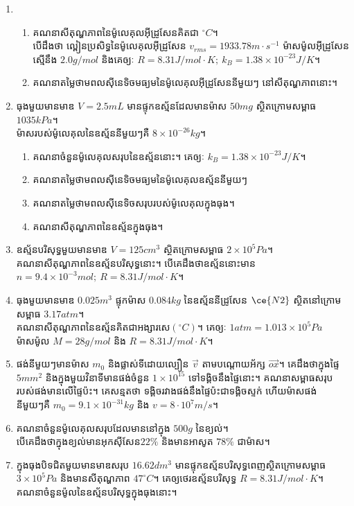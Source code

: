 \begin{enumerate}[m]
\begin{enumerate}[k]
\end{enumerate}
\item \begin{enumerate}[k]
	\item គណនាសីតុណ្ហភាពនៃម៉ូលេគុលអុីដ្រូសែនគិតជា $^\circ C$។\\ បើដឹងថា ល្ពៀនប្រសិទ្ធនៃម៉ូលេគុលអុីដ្រូសែន $v_{rms}=1933.78m\cdot s^{-1}$ ម៉ាសម៉ូលអុីដ្រូសែនស្មើនឹង $2.0g/mol$ និងគេឲ្យៈ $R=8.31J/mol\cdot K;~k_{B}=1.38\times10^{-23}J/K$។
	\item គណនាតម្លៃថាមពលសុីនេទិចមធ្យមនៃម៉ូលេគុលអុីដ្រូសែននីមួយៗ នៅសីតុណ្ហភាពនោះ។​
\end{enumerate}
\item ធុងមួយមានមាឌ $V=2.5mL$ មានផ្ទុកឧស្ម័នដែលមានម៉ាស $50mg$ ស្ថិតក្រោមសម្ពាធ $1035kPa$។ \\ម៉ាសរបស់ម៉ូលេគុលនៃឧស្ម័ននីមួយៗគឺ $8\times10^{-26}kg$។
\begin{enumerate}[k]
	\item គណនាចំនួនម៉ូលេគុលសរុបនៃឧស្ម័ននោះ។ គេឲ្យៈ $k_{B}=1.38\times10^{-23}J/K$។
	\item គណនាតម្លៃថាមពលសុីនេទិចមធ្យមនៃម៉ូលេគុលឧស្ម័ននីមួយៗ
	\item គណនាតម្លៃថាមពលសុីនេទិចសរុបរបស់ម៉ូលេគុលក្នុងធុង។
	\item គណនាសីតុណ្ហភាពនៃឧស្ម័នក្នុងធុង។
\end{enumerate}
\item ឧស្ម័នបរិសុទ្ធមួយមានមាឌ $V=125cm^3$ ស្ថិតក្រោមសម្ពាធ $2\times10^{5}Pa$។\\ គណនាសីតុណ្ហភាពនៃឧស្ម័នបរិសុទ្ធនោះ។ បើគេដឹងថាឧស្ម័ននោះមាន $n=9.4\times10^{-3}mol;~R=8.31J/mol\cdot K$។
\item ធុងមួយមានមាឌ $0.025m^{3}$ ផ្ទុកម៉ាស $0.084kg$ នៃឧស្ម័ននីដ្រូសែន $\ce{N2}$ ស្ថិតនៅក្រោមសម្ពាធ $3.17atm$។\\ គណនាសីតុណ្ហភាពនៃឧស្ម័នគិតជាអង្សារសេ$\left(^\circ C\right)$។ គេឲ្យៈ $1atm=1.013\times10^{5}Pa$ ម៉ាសម៉ូល $M=28g/mol$ និង $R=8.31J/mol\cdot K$។
\item ផង់នីមួយៗមានម៉ាស $m_{0}$ និងផ្លាស់ទីដោយល្បឿន $\overrightarrow{v}$ តាមបណ្តោយអ័ក្ស $\overrightarrow{ox}$។ គេដឹងថាក្នុងផ្ទៃ $5mm^2$ និងក្នុងមួយវិនាទីមានផង់ចំនួន $1\times10^{15}$ ទៅទង្គិចនឹងផ្ទៃនោះ។ គណនាសម្ពាធសរុបរបស់ផង់មានលើផ្ទៃប៉ះ។ គេសន្មតថា ទង្គិចរវាងផង់នឹងផ្ទៃប៉ះជាទង្គិចស្ទក់ ហើយម៉ាសផង់នីមួយៗគឺ $m_{0}=9.1\times10^{-31}kg$ និង $v=8\cdot10^{7}m/s$។
\item គណនាចំនួនម៉ូលេគុលសរុបដែលមាននៅក្នុង $500g$ នៃខ្យល់។\\ បើគេដឹងថាក្នុងខ្យល់មានអុកសុីសែន​ $22\%$ និងមានអាសូត $78\%$ ជាម៉ាស។
\item ក្នុងធុងបិទជិតមួយមានមាឌសរុប $16.62dm^3$ មានផ្ទុកឧស្ម័នបរិសុទ្ធពេញស្ថិតក្រោមសម្ពាធ $3\times10^{5}Pa$ និងមានសីតុណ្ហភាព $47^\circ C$។ គេឲ្យថេរឧស្ម័នបរិសុទ្ធ $R=8.31J/mol\cdot K$។ គណនាចំនួនម៉ូលនៃឧស្ម័នបរិសុទ្ធក្នុងធុងនោះ។

\end{enumerate}
